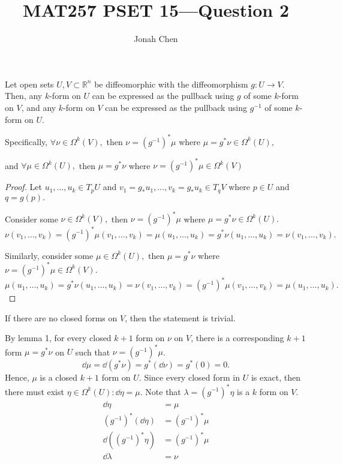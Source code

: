 \documentclass{exam}
\title{MAT257 PSET 15---Question 2}
\author{Jonah Chen}
\date{}
\numberwithin{equation}{section}
\newcommand{\R}{\mathbb{R}}
\begin{document}
    \sffamily
    \maketitle

    \begin{lemma}
        Let open sets \(U,V\subset\R^n\) be diffeomorphic with the diffeomorphism \(g:U\to V.\) Then, any \(k\)-form on \(U\) can be expressed as the pullback using \(g\) of some \(k\)-form on \(V\), and any \(k\)-form on \(V\) can be expressed as the pullback using \(g^{-1}\) of some \(k\)-form on \(U\).

        \vspace{3pt}
        Specifically, \(\forall\nu\in\Omega^k(V),\) then \(\nu=(g^{-1})^*\mu\) where \(\mu=g^*\nu\in\Omega^k(U),\) 
        
        and \(\forall\mu\in\Omega^k(U),\) then \(\mu=g^*\nu\) where \(\nu=(g^{-1})^*\mu\in\Omega^k(V)\)

        \begin{proof}
            Let \(u_1,\dots,u_k\in T_pU\) and \(v_1=g_*u_1,\dots,v_k=g_*u_k\in T_qV\) where \(p\in U\) and \(q=g(p).\)
            \vspace{3pt}

            Consider some \(\nu\in\Omega^k(V),\) then \(\nu=(g^{-1})^*\mu\) where \(\mu=g^*\nu\in\Omega^k(U).\)
            \[\nu(v_1,\dots,v_k)=(g^{-1})^*\mu(v_1,\dots,v_k)=\mu(u_1,\dots,u_k)=g^*\nu(u_1,\dots,u_k)=\nu(v_1,\dots,v_k).\]

            Similarly, consider some \(\mu\in\Omega^k(U),\) then \(\mu=g^*\nu\) where \(\nu=(g^{-1})^*\mu\in\Omega^k(V)\).
            \[\mu(u_1,\dots,u_k)=g^*\nu(u_1,\dots,u_k)=\nu(v_1,\dots,v_k)=(g^{-1})^*\mu(v_1,\dots,v_k)=\mu(u_1,\dots,u_k).\]
        \end{proof}
    \end{lemma}


    If there are no closed forms on \(V\), then the statement is trivial.

    By lemma 1, for every closed \(k+1\) form on \(\nu\) on \(V\), there is a corresponding \(k+1\) form \(\mu=g^*\nu\) on \(U\) such that \(\nu=(g^{-1})^*\mu\).
    \[\dd\mu=\dd(g^*\nu)=g^*(\dd\nu)=g^*(0)=0.\]
    Hence, \(\mu\) is a closed \(k+1\) form on \(U\). Since every closed form in \(U\) is exact, then there must exist \(\eta\in\Omega^k(U):\dd\eta=\mu.\) Note that \(\lambda=(g^{-1})^*\eta\) is a $k$ form on \(V\).
    \begin{align*}
        \dd\eta&=\mu\\
        (g^{-1})^*(\dd\eta)&=(g^{-1})^*\mu\\
        \dd((g^{-1})^*\eta)&=(g^{-1})^*\mu\\
        \dd\lambda&=\nu
    \end{align*}
\end{document}

